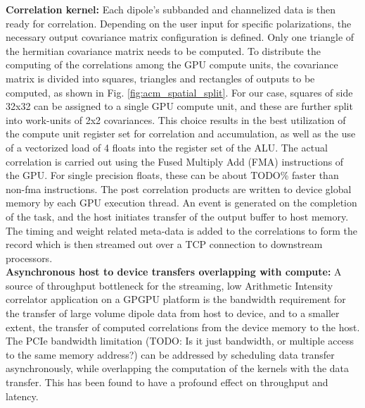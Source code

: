 \documentclass{ws-jai}
\begin{document}
\noindent \textbf {Correlation kernel:}  Each dipole's subbanded and channelized
data is  then ready for correlation.   Depending on the user  input for specific
polarizations,  the   necessary  output   covariance  matrix   configuration  is
defined. Only  one triangle  of the  hermitian covariance matrix needs  to be  computed. To
distribute the  computing of the correlations  among the GPU compute  units, the
covariance matrix is  divided into squares, triangles and  rectangles of outputs
to be  computed, as  shown in Fig.   \ref{fig:acm_spatial_split}. For  our case,
squares of side  32x32 can be assigned  to a single GPU compute  unit, and these
are further split into work-units of 2x2 covariances. This choice results in the
best  utilization  of  the  compute   unit  register  set  for  correlation  and
accumulation, as  well as  the use  of a vectorized  load of  4 floats  into the
register set of the ALU.  The actual  correlation is carried out using the Fused
Multiply Add (FMA) instructions of the  GPU.  For single precision floats, these
can  be about  TODO\% faster  than non-fma  instructions.  The  post correlation
products are written  to device global memory by each  GPU execution thread.  An
event  is generated  on  the completion  of  the task,  and  the host  initiates
transfer  of the  output buffer  to host  memory. The  timing and  weight related
meta-data is added to the correlations to  form the record which is then streamed
out over a TCP connection to downstream processors.\\

\noindent  \textbf  {Asynchronous  host  to device  transfers  overlapping  with
  compute:} A source  of throughput bottleneck for the  streaming, low Arithmetic
Intensity  correlator  application   on  a  GPGPU  platform   is  the  bandwidth
requirement for  the transfer of large  volume dipole data from  host to device,
and to a  smaller extent, the transfer of computed  correlations from the device
memory to the  host. The PCIe bandwidth limitation (TODO:  Is it just bandwidth,
or multiple access  to the same memory address?) can  be addressed by scheduling
data transfer asynchronously,  while overlapping the computation  of the kernels
with  the data  transfer.  This  has been  found to  have a  profound effect  on
throughput and latency.\\
\end{document}
